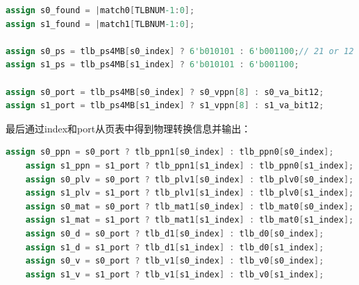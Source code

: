 \documentclass[11pt]{article}
\begin{document}
\begin{enumerate}
\begin{lstlisting}[language=verilog]
assign s0_found = |match0[TLBNUM-1:0];
assign s1_found = |match1[TLBNUM-1:0];

assign s0_ps = tlb_ps4MB[s0_index] ? 6'b010101 : 6'b001100;// 21 or 12 
assign s1_ps = tlb_ps4MB[s1_index] ? 6'b010101 : 6'b001100;

assign s0_port = tlb_ps4MB[s0_index] ? s0_vppn[8] : s0_va_bit12;
assign s1_port = tlb_ps4MB[s1_index] ? s1_vppn[8] : s1_va_bit12;

  \end{lstlisting}
  最后通过index和port从页表中得到物理转换信息并输出：
  \begin{lstlisting}[language=verilog]
    assign s0_ppn = s0_port ? tlb_ppn1[s0_index] : tlb_ppn0[s0_index];
    assign s1_ppn = s1_port ? tlb_ppn1[s1_index] : tlb_ppn0[s1_index];
    assign s0_plv = s0_port ? tlb_plv1[s0_index] : tlb_plv0[s0_index];
    assign s1_plv = s1_port ? tlb_plv1[s1_index] : tlb_plv0[s1_index];
    assign s0_mat = s0_port ? tlb_mat1[s0_index] : tlb_mat0[s0_index];
    assign s1_mat = s1_port ? tlb_mat1[s1_index] : tlb_mat0[s1_index];
    assign s0_d = s0_port ? tlb_d1[s0_index] : tlb_d0[s0_index];
    assign s1_d = s1_port ? tlb_d1[s1_index] : tlb_d0[s1_index];
    assign s0_v = s0_port ? tlb_v1[s0_index] : tlb_v0[s0_index];
    assign s1_v = s1_port ? tlb_v1[s1_index] : tlb_v0[s1_index];
      \end{lstlisting}
\end{enumerate}
\end{document}
